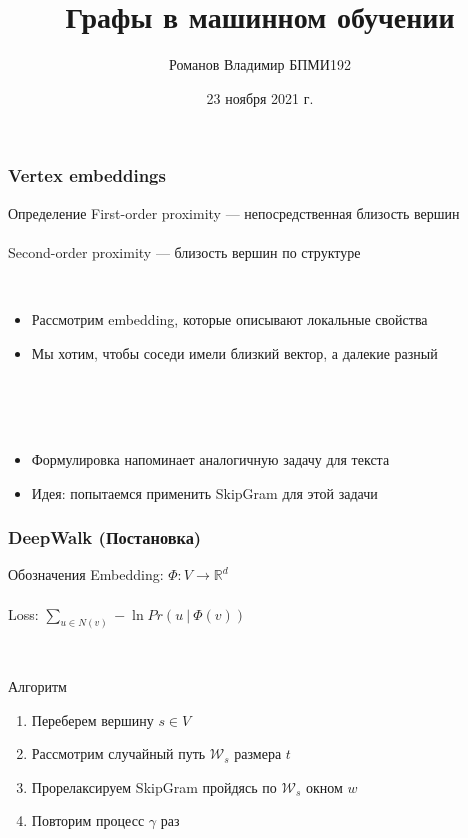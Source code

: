 \documentclass{beamer}
\title{Графы в машинном обучении}
\author[Романов Владимир]{Романов Владимир БПМИ192}
\institute[ВШЭ]{Национальный исследовательский университет \\ «Высшая школа экономики» (Москва)}
\date{23 ноября 2021 г.}
\newcommand{\R}{\mathbb{R}}
\newcommand{\skipline}[0]{$ $\\}
\begin{document}
\frame{\titlepage}





\begin{frame}
    \frametitle{Vertex embeddings}
    \begin{block}{Определение}
        First-order proximity --- непосредственная близость вершин 
        \skipline
        \skipline
        Second-order proximity --- близость вершин по структуре
    \end{block}
    \skipline
    \begin{itemize}
        \item Рассмотрим embedding, которые описывают локальные свойства
        \item Мы хотим, чтобы соседи имели близкий вектор, а далекие разный
    \end{itemize}
    \skipline
    \skipline
    \skipline
    \begin{itemize}
        \item Формулировка напоминает аналогичную задачу для текста
        \item Идея: попытаемся применить SkipGram для этой задачи
    \end{itemize}
\end{frame}

\begin{frame}
    \frametitle{DeepWalk (Постановка)}

    \begin{block}{Обозначения}
        Embedding: $\varPhi: V \to \R^d$ 
        \skipline
        \skipline
        Loss: $\sum_{u \in N(v)} -\ln Pr\left(u \ \vert\ \varPhi(v)\right)$
    \end{block}
    \skipline
    \begin{block}{Алгоритм}
        \begin{enumerate}
            \item Переберем вершину $s \in V$
            \item Рассмотрим случайный путь $\mathcal{W}_s$ размера $t$
            \item Прорелаксируем SkipGram пройдясь по $\mathcal{W}_s$ окном $w$
            \item Повторим процесс $\gamma$ раз
        \end{enumerate}
    \end{block}
\end{frame}
\end{document}
